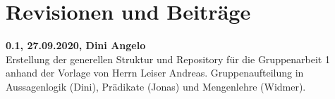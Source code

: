 \newpage

\section{Revisionen und Beiträge}

\textbf{0.1, 27.09.2020, Dini Angelo}\\
Erstellung der generellen Struktur und Repository für die Gruppenarbeit 1 anhand
der Vorlage von Herrn Leiser Andreas. Gruppenaufteilung in Aussagenlogik 
(Dini), Prädikate (Jonas) und Mengenlehre (Widmer).
\\\\
